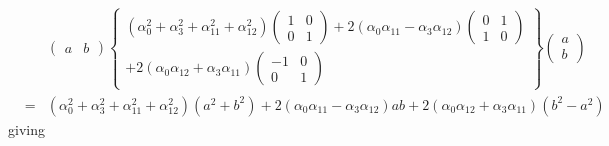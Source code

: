 \documentclass[aps,preprint]{revtex4}
\begin{document}
\begin{eqnarray}
&&\left( 
\begin{array}{cc}
a & b%
\end{array}%
\right) \left\{ 
\begin{array}{c}
\left( \alpha _{0}^{2}+\alpha _{3}^{2}+\alpha _{11}^{2}+\alpha
_{12}^{2}\right) \left( 
\begin{array}{cc}
1 & 0 \\ 
0 & 1%
\end{array}%
\right) +2\left( \alpha _{0}\alpha _{11}-\alpha _{3}\alpha _{12}\right)
\left( 
\begin{array}{cc}
0 & 1 \\ 
1 & 0%
\end{array}%
\right) \\ 
+2\left( \alpha _{0}\alpha _{12}+\alpha _{3}\alpha _{11}\right) \left( 
\begin{array}{cc}
-1 & 0 \\ 
0 & 1%
\end{array}%
\right)%
\end{array}%
\right\} \left( 
\begin{array}{c}
a \\ 
b%
\end{array}%
\right) \\
&=&\left( \alpha _{0}^{2}+\alpha _{3}^{2}+\alpha _{11}^{2}+\alpha
_{12}^{2}\right) \left( a^{2}+b^{2}\right) +2\left( \alpha _{0}\alpha
_{11}-\alpha _{3}\alpha _{12}\right) ab+2\left( \alpha _{0}\alpha
_{12}+\alpha _{3}\alpha _{11}\right) \left( b^{2}-a^{2}\right)
\end{eqnarray}%
giving%
\end{document}

